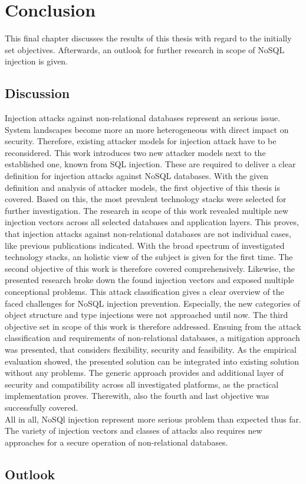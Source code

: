 \chapter{Conclusion}
This final chapter discusses the results of this thesis with regard to the initially set objectives. Afterwards, an outlook for further research in scope of NoSQL injection is given.

\section{Discussion}
Injection attacks against non-relational databases represent an serious issue. System landscapes become more an more heterogeneous with direct impact on security. Therefore, existing attacker models for injection attack have to be reconsidered. This work introduces two new attacker models next to the established one, known from SQL injection. These are required to deliver a clear definition for injection attacks against NoSQL databases. With the given definition and analysis of attacker models, the first objective of this thesis is covered. Based on this, the most prevalent technology stacks were selected for further investigation. The research in scope of this work revealed multiple new injection vectors across all selected databases and application layers. This proves, that injection attacks against non-relational databases are not individual cases, like previous publications indicated. With the broad spectrum of investigated technology stacks, an holistic view of the subject is given for the first time. The second objective of this work is therefore covered comprehensively. Likewise, the presented research broke down the found injection vectors and exposed multiple conceptional problems. This attack classification gives a clear overview of the faced challenges for NoSQL injection prevention. Especially, the new categories of object structure and type injections were not approached until now. The third objective set in scope of this work is therefore addressed. Ensuing from the attack classification and requirements of non-relational databases, a mitigation approach was presented, that considers flexibility, security and feasibility. As the empirical evaluation showed, the presented solution can be integrated into existing solution without any problems. The generic approach provides and additional layer of security and compatibility across all investigated platforms, as the practical implementation proves. Therewith, also the fourth and last objective was successfully covered. \\

All in all, NoSQl injection represent more serious problem than expected thus far. The variety of injection vectors and classes of attacks also requires new approaches for a secure operation of non-relational databases. 

\section{Outlook}